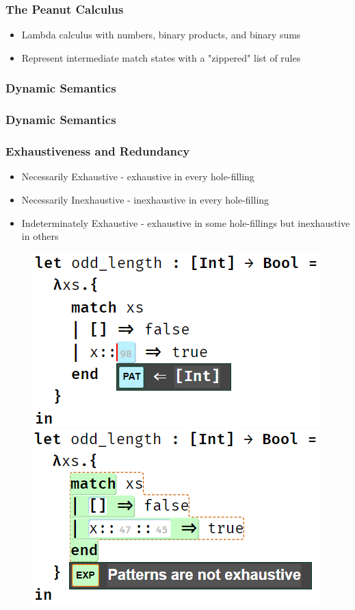\documentclass{beamer}
\begin{document}
\begin{frame}
\frametitle{The Peanut Calculus}
\begin{itemize}
\item Lambda calculus with numbers, binary products, and binary sums
\item Represent intermediate match states with a "zippered" list of rules
\end{itemize}

\end{frame}

\begin{frame}
	\frametitle{Dynamic Semantics}
	
\end{frame}

\begin{frame}
	\frametitle{Dynamic Semantics}
	
\end{frame}

\begin{frame}
	\frametitle{Exhaustiveness and Redundancy}
	\begin{itemize}
		\item Necessarily Exhaustive - exhaustive in every hole-filling
		\item Necessarily Inexhaustive - inexhaustive in every hole-filling
		\item Indeterminately Exhaustive - exhaustive in some hole-fillings but inexhaustive in others
	\end{itemize}
	\begin{figure}
		\centering
		\includegraphics[scale=0.5]{imgs/maybe_exhaustive.png}
		\hfil
		\includegraphics[scale=0.5]{imgs/not_exhaustive.png}
	\end{figure}
\end{frame}
\end{document}
